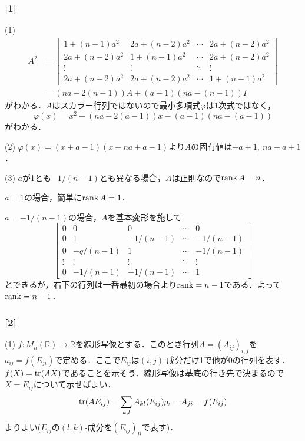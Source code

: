 \documentclass[a4j]{ltjsarticle}
\newcommand{\Rset}{\mathbb{R}}
\newcommand{\1}{\mathbbm{1}}
\numberwithin{equation}{section}
\theoremstyle{definition}
\begin{document}
\subsubsection*{[1]}
(1) 
\begin{align}
    A^2&=\begin{bmatrix}
        1+(n-1)a^2 & 2a+(n-2)a^2 & \cdots & 2a+(n-2)a^2 \\ 
        2a+(n-2)a^2 & 1+(n-1)a^2 & \cdots & 2a+(n-2)a^2 \\
        \vdots & \vdots & \ddots & \vdots \\
        2a+(n-2)a^2 & 2a+(n-2)a^2 & \cdots & 1+(n-1)a^2
    \end{bmatrix}\\
    &=(na-2(n-1))A+(a-1)(na-(n-1))I
\end{align}
がわかる．$A$はスカラー行列ではないので最小多項式$\varphi$は1次式ではなく，
\begin{equation}
    \varphi(x)=x^2-(na-2(a-1))x-(a-1)(na-(a-1))
\end{equation}
がわかる．

(2) $\varphi(x)=(x+a-1)(x-na+a-1)$より$A$の固有値は$-a+1,\ na-a+1$．

(3) $a$が1とも$-1/(n-1)$とも異なる場合，$A$は正則なので$\rank A=n$．

$a=1$の場合，簡単に$\rank A=1$．

$a=-1/(n-1)$の場合，$A$を基本変形を施して
\begin{equation}
    \begin{bmatrix}
        0 & 0 & 0 & \cdots & 0 \\
        0 & 1 & -1/(n-1) & \cdots & -1/(n-1) \\
        0 & -q/(n-1) & 1 & \cdots & -1/(n-1) \\
        \vdots & \vdots & \vdots & \ddots & \vdots \\
        0 & -1/(n-1) & -1/(n-1) & \cdots & 1
    \end{bmatrix}
\end{equation}
とできるが，右下の行列は一番最初の場合より$\rank=n-1$である．よって$\rank=n-1$．

\subsubsection*{[2]}
(1) $f\colon M_n(\Rset)\to\Rset$を線形写像とする．このとき行列$A=(A_{ij})_{i,j}$を$a_{ij}=f(E_{ji})$で定める．ここで$E_{ij}$は$(i,j)$-成分だけ1で他が0の行列を表す．$f(X)=\tr(AX)$であることを示そう．線形写像は基底の行き先で決まるので$X=E_{ij}$について示せばよい．
\begin{equation}
    \tr(AE_{ij})=\sum_{k,l}A_{kl}(E_{ij})_{lk}=A_{ji}=f(E_{ij})
\end{equation}
よりよい($E_{ij}$の$(l,k)$-成分を$(E_{ij})_{li}$で表す)．
\end{document}
